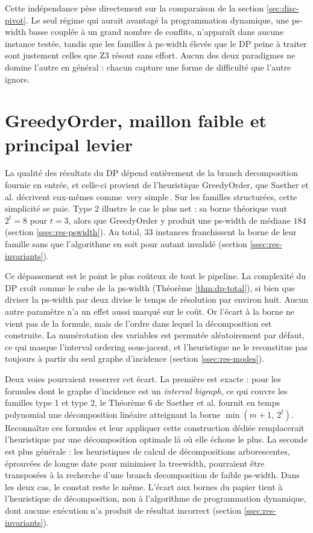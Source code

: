 \documentclass[11pt,a4paper]{report}
\theoremstyle{plain}
\theoremstyle{definition}
\begin{document}
Cette indépendance pèse directement sur la comparaison de la
section \ref{sec:disc-pivot}. Le seul régime qui aurait avantagé la
programmation dynamique, une ps-width basse couplée à un grand
nombre de conflits, n'apparaît dans aucune instance testée, tandis
que les familles à ps-width élevée que le DP peine à traiter sont
justement celles que Z3 résout sans effort. Aucun des deux
paradigmes ne domine l'autre en général : chacun capture une forme
de difficulté que l'autre ignore.

\section{GreedyOrder, maillon faible et principal levier}
\label{sec:disc-greedy}

La qualité des résultats du DP dépend entièrement de la branch
decomposition fournie en entrée, et celle-ci provient de
l'heuristique GreedyOrder, que Saether et al. \cite{saether2015}
décrivent eux-mêmes comme \og\,very simple\,\fg{}. Sur les familles
structurées, cette simplicité se paie. Type 2 illustre le cas le
plus net : sa borne théorique vaut $2^t = 8$ pour $t = 3$, alors
que GreedyOrder y produit une ps-width de médiane $184$
(section \ref{ssec:res-pswidth}). Au total, $33$ instances
franchissent la borne de leur famille sans que l'algorithme en soit
pour autant invalidé (section \ref{ssec:res-invariants}).

Ce dépassement est le point le plus coûteux de tout le pipeline. La
complexité du DP croît comme le cube de la ps-width
(Théorème \ref{thm:dp-total}), si bien que diviser la ps-width par
deux divise le temps de résolution par environ huit. Aucun autre
paramètre n'a un effet aussi marqué sur le coût. Or l'écart à la
borne ne vient pas de la formule, mais de l'ordre dans lequel la
décomposition est construite. La numérotation des variables est
permutée aléatoirement par défaut, ce qui masque l'interval
ordering sous-jacent, et l'heuristique ne le reconstitue pas
toujours à partir du seul graphe d'incidence
(section \ref{ssec:res-modes}).

Deux voies pourraient resserrer cet écart. La première est exacte :
pour les formules dont le graphe d'incidence est un \emph{interval
bigraph}, ce qui couvre les familles type 1 et type 2, le
Théorème 6 de Saether et al. \cite{saether2015} fournit en temps
polynomial une décomposition linéaire atteignant la borne
$\min(m + 1,\ 2^t)$. Reconnaître ces formules et leur appliquer
cette construction dédiée remplacerait l'heuristique par une
décomposition optimale là où elle échoue le plus. La seconde est
plus générale : les heuristiques de calcul de décompositions
arborescentes, éprouvées de longue date pour minimiser la
treewidth, pourraient être transposées à la recherche d'une branch
decomposition de faible ps-width. Dans les deux cas, le constat
reste le même. L'écart aux bornes du papier tient à l'heuristique
de décomposition, non à l'algorithme de programmation dynamique,
dont aucune exécution n'a produit de résultat incorrect
(section \ref{ssec:res-invariants}).
\end{document}
